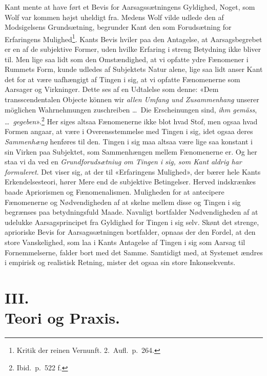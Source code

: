 \documentclass[12pt,a4paper]{article}
\newcommand{\apage}[1]{\marginnote{\footnotesize\textit{[#1]}}}
\begin{document}
Kant mente at have ført et Bevis for Aarsagssætningens Gyldighed, Noget,
som Wolf var kommen højst uheldigt fra. Medens Wolf vilde udlede den af
Modsigelsens Grundsætning, begrunder Kant den som Forudsætning for
Erfaringens Mulighed\footnote{Kritik der reinen Vernunft. 2.\
Aufl.\ p.\ 264.}. Kants Bevis hviler paa den Antagelse, at
Aarsagsbegrebet er en af de subjektive Former, uden hvilke Erfaring i
streng Betydning ikke bliver til. Men lige saa lidt som den
Omstændighed, at vi opfatte ydre Fænomener i Rummets Form, kunde udledes
af Subjektets Natur alene, lige saa lidt anser Kant det for at være
uafhængigt af Tingen i sig, at vi opfatte Fænomenerne som Aarsager og
Virkninger. Dette ses af en Udtalelse som denne: «Dem transscendentalen
Objecte können wir \emph{allen Umfang und Zusammenhang} unserer möglichen
Wahrnehmungen zuschreiben \ldots\ Die Erscheinungen sind, \emph{ihm gemäss},
\ldots\ \emph{gegeben}».\footnote{Ibid.\ p.\ 522 f.} Her siges altsaa
Fænomenerne ikke blot hvad Stof, men ogsaa hvad Formen angaar, at være i
Overensstemmelse med Tingen i sig, idet ogsaa deres \emph{Sammenhæng} henføres
til den. Tingen i sig maa altsaa være lige saa konstant i sin Virken paa
Subjektet, som Sammenhængen mellem Fænomenerne er. Og her staa vi da ved
en \emph{Grundforudsætniug om Tingen i sig, som Kant aldrig har formuleret}. Det
viser sig, at der til «Erfaringens Mulighed», der bærer hele Kants
Erkendelsesteori, hører \apage{35}  Mere end de subjektive Betingelser. Herved
indskrænkes baade Apriorismen og Fænomenalismen. Muligheden for at
antecipere Fænomenerne og Nødvendigheden af at skelne mellem disse og
Tingen i sig begrænses paa betydningsfuld Maade. Navnligt bortfalder
Nødvendigheden af at udelukke Aarsagsprincipet fra Gyldighed for Tingen i
sig selv. Skønt det strenge, aprioriske Bevis for Aarsagssætningen
bortfalder, opnaas der den Fordel, at den store Vanskelighed, som laa i
Kants Antagelse af Tingen i sig som Aarsag til Fornemmelserne, falder
bort med det Samme. Samtidigt med, at Systemet ændres i empirisk og
realistisk Retning, mister det ogsaa sin store Inkonsekvents.

\section*{III.\\ Teori og Praxis.}
\end{document}
